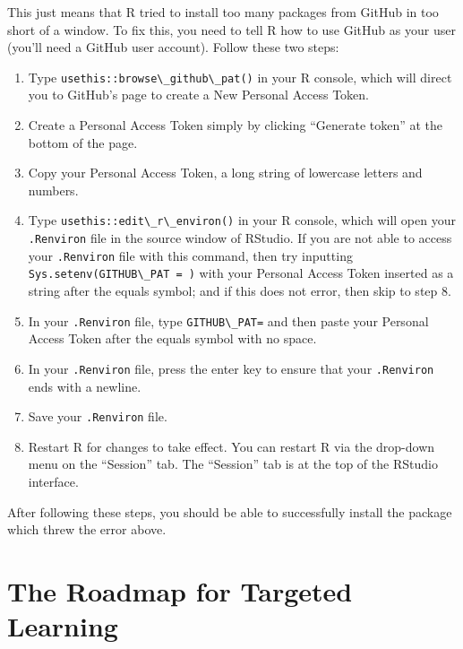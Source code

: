 \documentclass[
  12pt, krantz2,
]{book}
\newcommand{\passthrough}[1]{#1}
\providecommand{\tightlist}{%
  \setlength{\itemsep}{0pt}\setlength{\parskip}{0pt}}
\theoremstyle{definition}
\theoremstyle{definition}
\theoremstyle{definition}
\newcommand{\1}{\mathbbm{1}}
\begin{document}
This just means that R tried to install too many packages from GitHub in too
short of a window. To fix this, you need to tell R how to use GitHub as your
user (you'll need a GitHub user account). Follow these two steps:

\begin{enumerate}
\def\labelenumi{\arabic{enumi}.}
\tightlist
\item
  Type \passthrough{\lstinline!usethis::browse\_github\_pat()!} in your R console, which will direct
  you to GitHub's page to create a New Personal Access Token.
\item
  Create a Personal Access Token simply by clicking ``Generate token'' at the
  bottom of the page.
\item
  Copy your Personal Access Token, a long string of lowercase letters and
  numbers.
\item
  Type \passthrough{\lstinline!usethis::edit\_r\_environ()!} in your R console, which will open your
  \passthrough{\lstinline!.Renviron!} file in the source window of RStudio. If you are not able to
  access your \passthrough{\lstinline!.Renviron!} file with this command, then try inputting
  \passthrough{\lstinline!Sys.setenv(GITHUB\_PAT = )!} with your Personal Access Token inserted as a
  string after the equals symbol; and if this does not error, then skip to
  step 8.
\item
  In your \passthrough{\lstinline!.Renviron!} file, type \passthrough{\lstinline!GITHUB\_PAT=!} and then paste your Personal
  Access Token after the equals symbol with no space.
\item
  In your \passthrough{\lstinline!.Renviron!} file, press the enter key to ensure that your \passthrough{\lstinline!.Renviron!}
  ends with a newline.
\item
  Save your \passthrough{\lstinline!.Renviron!} file.
\item
  Restart R for changes to take effect. You can restart R via the drop-down
  menu on the ``Session'' tab. The ``Session'' tab is at the top of the RStudio
  interface.
\end{enumerate}

After following these steps, you should be able to successfully install the
package which threw the error above.

\hypertarget{intro}{%
\chapter{The Roadmap for Targeted Learning}\label{intro}}
\end{document}
